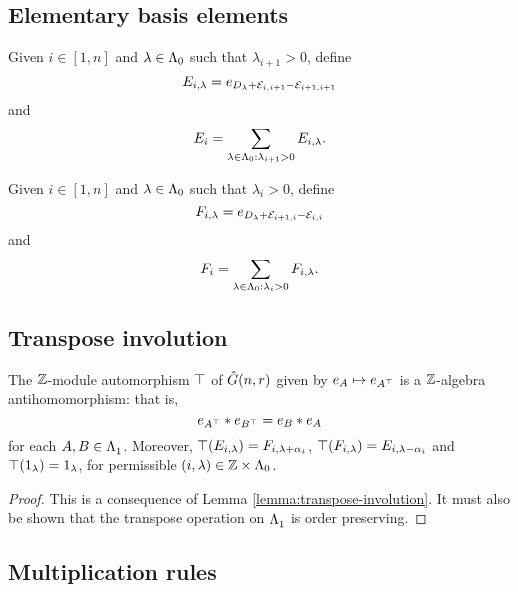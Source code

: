 \documentclass[a4paper, 11pt]{report}
\begin{document}
\subsection{Elementary basis elements}

Given $i\in[1,n]$ and $\lambda\in{\Lambda_0}$ such that $\lambda_{i+1}>0$, define
\begin{equation*}
E_{i,\lambda} = e_{D_\lambda + \mathcal{E}_{i,i+1} - \mathcal{E}_{i+1,i+1}}
\end{equation*}
and
\begin{equation*}
E_i = \sum_{\lambda\in{\Lambda_0}:\lambda_{i+1}>0} E_{i,\lambda}.
\end{equation*}

Given $i\in[1,n]$ and $\lambda\in{\Lambda_0}$ such that $\lambda_i>0$, define
\begin{equation*}
F_{i,\lambda} = e_{D_\lambda + \mathcal{E}_{i+1,i} - \mathcal{E}_{i,i}}
\end{equation*}
and
\begin{equation*}
F_i = \sum_{\lambda\in{\Lambda_0}:\lambda_i>0} F_{i,\lambda}.
\end{equation*}

\subsection{Transpose involution}

\begin{lemma}\label{lemma:transpose-involution-generic}
The $\mathbb{Z}$-module automorphism $\top$ of $\hat{G}(n,r)$ given by $e_A\mapsto e_{A^\top}$ is a $\mathbb{Z}$-algebra antihomomorphism: that is,
\begin{equation*}
e_{A^\top}\ast e_{B^\top} = e_B\ast e_A
\end{equation*}
for each $A,B\in\Lambda_1^{}$. Moreover, $\top(E_{i,\lambda}) = F_{i,\lambda+\alpha_i}$, $\top(F_{i,\lambda}) = E_{i,\lambda - \alpha_i}$ and $\top(1_\lambda) = 1_\lambda$, for permissible $(i,\lambda)\in\mathbb{Z}\times{\Lambda_0}$.
\end{lemma}
\begin{proof}
This is a consequence of Lemma \ref{lemma:transpose-involution}. {\color{blue}It must also be shown that the transpose operation on $\Lambda_1^{}$ is order preserving.}
\end{proof}

\subsection{Multiplication rules}
\end{document}
